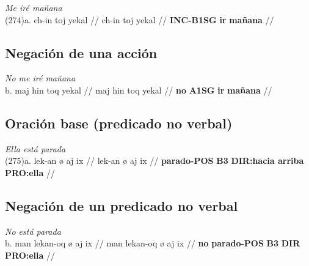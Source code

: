 \documentclass{article}%
\begin{document}
%
\par\medskip%
\ex
\textit{Me iré mañana} \\
\begingl
\gla (274)a. ch-in toj yekal //
\glb ch-in toj yekal //
\glc \textbf{INC-}\textbf{B1SG} \textbf{ir} \textbf{mañana} //
\endgl
\xe
%
\medskip%
\subsection{Negación de una acción}%
\label{subsec:Negacindeunaaccin}%

%
\par\medskip%
\ex
\textit{No me iré mañana} \\
\begingl
\gla b. maj hin toq yekal //
\glb maj hin toq yekal //
\glc \textbf{no} \textbf{A1SG} \textbf{ir} \textbf{mañana} //
\endgl
\xe
%
\medskip%
\subsection{Oración base (predicado no verbal)}%
\label{subsec:Oracinbase(predicadonoverbal)}%

%
\par\medskip%
\ex
\textit{Ella está parada} \\
\begingl
\gla (275)a. lek-an ø aj ix //
\glb lek-an ø aj ix //
\glc \textbf{parado-}\textbf{POS} \textbf{B3} \textbf{DIR:hacia arriba} \textbf{PRO:ella} //
\endgl
\xe
%
\medskip%
\subsection{Negación de un predicado no verbal}%
\label{subsec:Negacindeunpredicadonoverbal}%

%
\par\medskip%
\ex
\textit{No está parada} \\
\begingl
\gla b. man lekan-oq ø aj ix //
\glb man lekan-oq ø aj ix //
\glc \textbf{no} \textbf{parado-}\textbf{POS} \textbf{B3} \textbf{DIR} \textbf{PRO:ella} //
\endgl
\xe
%
\medskip

%
\end{document}
